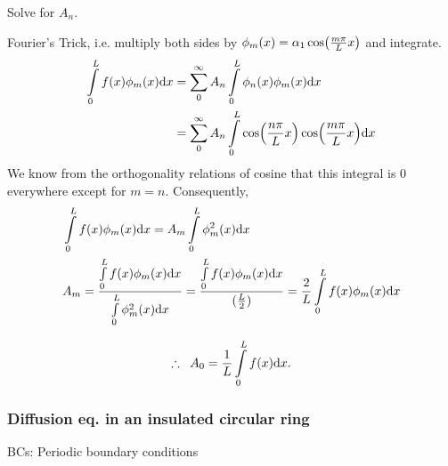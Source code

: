 \begin{quest}
	\item Solve for $A_n$.
	\begin{ans}
		Fourier's Trick, i.e. multiply both sides by $\phi_m(x) = \alpha_1 \cos(\frac{m\pi}{L} x)$ and integrate. 
		\[\begin{aligned}
			\int\limits_0^L f(x) \phi_m(x) \text{d} x
				&= \sum\limits_0^\infty A_n \int\limits_0^L \phi_n(x) \phi_m(x) \text{d} x \\
				&= \sum\limits_0^\infty A_n \int\limits_0^L \cos(\frac{n\pi}{L} x) \cos(\frac{m\pi}{L} x) \text{d} x
		\end{aligned}\]
		We know from the orthogonality relations of cosine that this integral is 0 everywhere except for $m = n$. Consequently, 
		\[\begin{aligned}
			&\int\limits_0^L f(x) \phi_m(x) \text{d} x = A_m \int\limits_0^L \phi^2_m(x) \text{d} x \\
			& A_m = 
				\frac{ \int\limits_0^L f(x) \phi_m(x) \text{d} x }{ \int\limits_0^L \phi^2_m(x) \text{d} x } = \frac{ \int\limits_0^L f(x) \phi_m(x) \text{d} x}{ (\frac{L}{2})  }
				= \frac{2}{L} \int\limits_0^L f(x) \phi_m(x) \text{d} x \\
		\end{aligned}\]
	\end{ans}

	\item 
\end{quest}
\begin{equation} 
	\therefore \;\; A_0 = \frac{1}{L} \int\limits_0^L f(x) \text{d} x .
\end{equation}



\subsubsection*{Diffusion eq. in an insulated circular ring}


BCs: Periodic boundary conditions